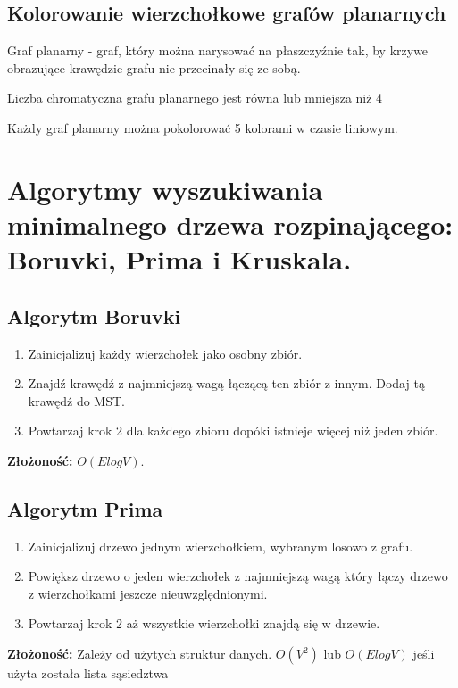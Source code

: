 \documentclass[12pt]{article}
\begin{document}
    \subsection{Kolorowanie wierzchołkowe grafów planarnych}
    
    \begin{definition}
        Graf planarny - graf, który można narysować na płaszczyźnie tak, by krzywe obrazujące krawędzie grafu nie przecinały się ze sobą.
    \end{definition}
    
    \begin{theorem}
        Liczba chromatyczna grafu planarnego jest równa lub mniejsza niż 4
    \end{theorem}
    
    Każdy graf planarny można pokolorować 5 kolorami w czasie liniowym.
    
    
    
    
    
    \newpage
    
    \section{Algorytmy wyszukiwania minimalnego drzewa rozpinającego: Boruvki, Prima i Kruskala.}
    
    \subsection{Algorytm Boruvki}
    \begin{enumerate}
        \item Zainicjalizuj każdy wierzchołek jako osobny zbiór.
        \item Znajdź krawędź z najmniejszą wagą łączącą ten zbiór z innym. Dodaj tą krawędź do MST.
        \item Powtarzaj krok 2 dla każdego zbioru dopóki istnieje więcej niż jeden zbiór.
    \end{enumerate}
    \textbf{Złożoność:} $O(ElogV)$.
    
    
    \subsection{Algorytm Prima}
    \begin{enumerate}
        \item Zainicjalizuj drzewo jednym wierzchołkiem, wybranym losowo z grafu.
        \item Powiększ drzewo o jeden wierzchołek z najmniejszą wagą który łączy drzewo z wierzchołkami jeszcze nieuwzględnionymi.
        \item Powtarzaj krok 2 aż wszystkie wierzchołki znajdą się w drzewie.
    \end{enumerate}
    \textbf{Złożoność:} Zależy od użytych struktur danych. $O(V^2)$ lub $O(ElogV)$ jeśli użyta została lista sąsiedztwa
    
\end{document}
